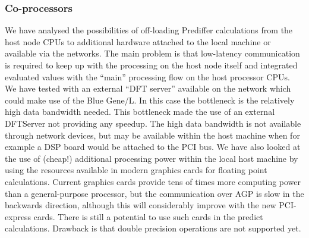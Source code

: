\documentclass[10pt]{lofar}
\begin{document}
\subsubsection{Co-processors}
We have analysed the possibilities of off-loading Prediffer calculations from the host node CPUs to additional hardware attached to the local machine or available via the networks. The main problem is that low-latency communication is required to keep up with the processing on the host node itself and integrated evaluated values with the “main” processing flow on the host processor CPUs.
We have tested with an external “DFT server” available on the network which could make use of the Blue Gene/L. In this case the bottleneck is the relatively high data bandwidth needed. This bottleneck made the use of an external DFTServer not providing any speedup.  The high data bandwidth is not available through network devices, but may be available within the host machine when for example a DSP board would be attached to the PCI bus.
We have also looked at the use of (cheap!) additional processing power within the local host machine by using the resources available in modern graphics cards for floating point calculations. Current graphics cards provide tens of times more computing power than a general-purpose processor, but the communication over AGP is slow in the backwards direction, although this will considerably improve with the new PCI-express cards. There is still a potential to use such cards in the predict calculations. Drawback is that double precision operations are not supported yet.
\end{document}
